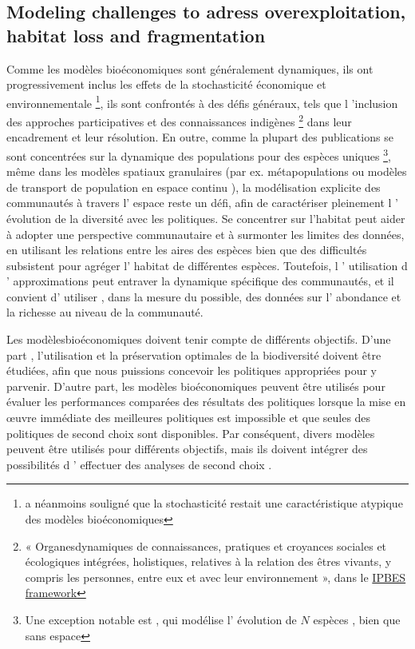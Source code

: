 \begin{displayquote}
\begin{displayquote}
\begin{displayquote}
{{{\subsection*{Modeling challenges to adress overexploitation, habitat loss and fragmentation}

 
Comme les modèles bioéconomiques sont généralement dynamiques, ils ont progressivement inclus les effets de la stochasticité économique et environnementale \footnote{\cite{Drechsler20200} a néanmoins souligné que la stochasticité restait une caractéristique atypique des modèles bioéconomiques }, ils sont confrontés à des défis généraux, tels que l 'inclusion des approches participatives et des connaissances indigènes \footnote{«  Organesdynamiques de connaissances, pratiques et croyances sociales et écologiques intégrées, holistiques, relatives à la relation des êtres vivants, y compris les personnes, entre eux et avec leur environnement », dans le \href{https://www. ipbes.net/glossary-tag/indigenous-and-local-knowledge}{IPBES framework}} dans leur encadrement et leur résolution. En outre, comme la plupart des publications se sont concentrées sur la dynamique des populations pour des espèces uniques \footnote{Une exception notable est \cite{brock_optimal_2002}, qui modélise l' évolution de $N$ espèces , bien que sans espace},   même dans les modèles spatiaux granulaires \citep{sanchirico_bioeconomics_1999, SANCHIRICO200523, costello_optimal_2008,brock_pattern_2010, Sanchirico2010, albers_invasive_2010, costello_private_2017} (par ex.   métapopulations ou modèles de transport de population en espace continu ), la modélisation explicite des communautés à travers l' espace reste un défi, afin de caractériser pleinement l ' évolution de la diversité avec les politiques. Se concentrer sur l'habitat peut aider à adopter une perspective communautaire et à surmonter les limites des données, en utilisant les relations entre les aires des espèces \citep{macarthur_theory_1967} bien que des difficultés subsistent pour agréger l' habitat de différentes espèces.   Toutefois, l ' utilisation d ' approximations peut entraver la dynamique spécifique des communautés, et il convient d' utiliser , dans la mesure du possible, des données sur l' abondance et la richesse au niveau de la communauté. 

 

  Les modèlesbioéconomiques doivent tenir compte de différents objectifs.   D'une part , l'utilisation et la préservation optimales de la biodiversité doivent être étudiées, afin que nous puissions concevoir les politiques appropriées pour y parvenir. D'autre part, les modèles bioéconomiques peuvent être utilisés pour évaluer les performances comparées des résultats des politiques lorsque la mise en œuvre immédiate des meilleures politiques est impossible et que seules des politiques de second choix sont disponibles. Par conséquent, divers modèles peuvent être utilisés pour différents objectifs, mais ils doivent intégrer des possibilités d ' effectuer des analyses de second choix . 



}}}
\end{displayquote}
\end{displayquote}
\end{displayquote}
